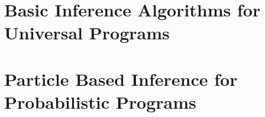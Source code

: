 

\section{Basic Inference Algorithms for Universal Programs}
\label{sec:proginf:inf}

\section{Particle Based Inference for Probabilistic Programs}
\label{sec:proginf:part}
